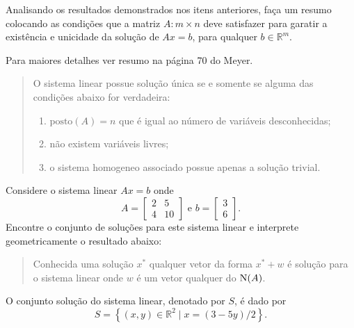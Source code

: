 \begin{questions}
    \question Analisando os resultados demonstrados nos itens anteriores, fa\c{c}a um resumo colocando as condi\c{c}\~{o}es que a matriz $A: m \times n$ deve satisfazer para garatir a exist\^{e}ncia e unicidade da solu\c{c}\~{a}o de $A x = b$, para qualquer $b \in \mathbb{R}^m$.
    \begin{solution}
        Para maiores detalhes ver resumo na p\'{a}gina 70 do Meyer\nocite{Meyer:2000:matrix}.
        \begin{quote}
            O sistema linear possue solu\c{c}\~{a}o única se e somente se alguma das condi\c{c}\~{o}es abaixo for verdadeira:
            \begin{enumerate}
                \item $\text{posto}(A) = n$ que \'{e} igual ao número de vari\'{a}veis desconhecidas;
                \item n\~{a}o existem vari\'{a}veis livres;
                \item o sistema homogeneo associado possue apenas a solu\c{c}\~{a}o trivial.
            \end{enumerate}
        \end{quote}
    \end{solution}

    \question Considere o sistema linear $A x = b$ onde
    \[
    A = \begin{bmatrix}
        2 & 5 \\
        4 & 10
    \end{bmatrix} \text{ e } b = \begin{bmatrix}
        3 \\
        6
    \end{bmatrix}.
    \]
    Encontre o conjunto de solu\c{c}\~{o}es para este sistema linear e interprete geometricamente o resultado abaixo:
    \begin{quote}
        Conhecida uma solu\c{c}\~{a}o $x^*$ qualquer vetor da forma $x^* + w$ \'{e} solu\c{c}\~{a}o para o sistema linear onde $w$ \'{e} um vetor qualquer do $\text{N} (A)$.
    \end{quote}
    \begin{solution}
        O conjunto solu\c{c}\~{a}o do sistema linear, denotado por $S$, \'{e} dado por
        \[
        S = \left\{ (x, y) \in \mathbb{R}^2 \mid x = \left( 3 - 5 y \right) / 2 \right\}.
        \]

        \begin{center}
        \end{center}
    \end{solution}


\end{questions}
